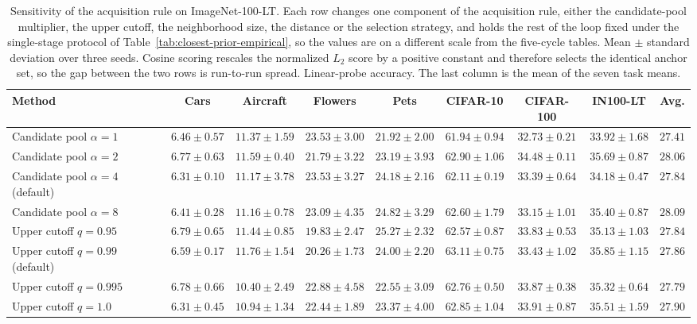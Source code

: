\begin{table}[t]
\centering
\small
\setlength{\tabcolsep}{4pt}
\caption{Sensitivity of the acquisition rule on ImageNet-100-LT. Each row changes one component of the acquisition rule, either the candidate-pool multiplier, the upper cutoff, the neighborhood size, the distance or the selection strategy, and holds the rest of the loop fixed under the single-stage protocol of Table~\ref{tab:closest-prior-empirical}, so the values are on a different scale from the five-cycle tables. Mean $\pm$ standard deviation over three seeds. Cosine scoring rescales the normalized $L_2$ score by a positive constant and therefore selects the identical anchor set, so the gap between the two rows is run-to-run spread. Linear-probe accuracy. The last column is the mean of the seven task means.}
\label{tab:selector-robustness-full-linear}
\begin{adjustbox}{max width=\textwidth}
\begin{tabular}{lcccccccc}
\toprule
Method & Cars & Aircraft & Flowers & Pets & CIFAR-10 & CIFAR-100 & IN100-LT & Avg. \\
\midrule
Candidate pool $\alpha=1$ & $6.46\pm0.57$ & $11.37\pm1.59$ & $23.53\pm3.00$ & $21.92\pm2.00$ & $61.94\pm0.94$ & $32.73\pm0.21$ & $33.92\pm1.68$ & $27.41$ \\
Candidate pool $\alpha=2$ & $6.77\pm0.63$ & $11.59\pm0.40$ & $21.79\pm3.22$ & $23.19\pm3.93$ & $62.90\pm1.06$ & $34.48\pm0.11$ & $35.69\pm0.87$ & $28.06$ \\
Candidate pool $\alpha=4$ (default) & $6.31\pm0.10$ & $11.17\pm3.78$ & $23.53\pm3.27$ & $24.18\pm2.16$ & $62.11\pm0.19$ & $33.39\pm0.64$ & $34.18\pm0.47$ & $27.84$ \\
Candidate pool $\alpha=8$ & $6.41\pm0.28$ & $11.16\pm0.78$ & $23.09\pm4.35$ & $24.82\pm3.29$ & $62.60\pm1.79$ & $33.15\pm1.01$ & $35.40\pm0.87$ & $28.09$ \\
Upper cutoff $q=0.95$ & $6.79\pm0.65$ & $11.44\pm0.85$ & $19.83\pm2.47$ & $25.27\pm2.32$ & $62.57\pm0.87$ & $33.83\pm0.53$ & $35.13\pm1.03$ & $27.84$ \\
Upper cutoff $q=0.99$ (default) & $6.59\pm0.17$ & $11.76\pm1.54$ & $20.26\pm1.73$ & $24.00\pm2.20$ & $63.11\pm0.75$ & $33.43\pm1.02$ & $35.85\pm1.15$ & $27.86$ \\
Upper cutoff $q=0.995$ & $6.78\pm0.66$ & $10.40\pm2.49$ & $22.88\pm4.58$ & $22.55\pm3.09$ & $62.76\pm0.50$ & $33.87\pm0.38$ & $35.32\pm0.64$ & $27.79$ \\
Upper cutoff $q=1.0$ & $6.31\pm0.45$ & $10.94\pm1.34$ & $22.44\pm1.89$ & $23.37\pm4.00$ & $62.85\pm1.04$ & $33.91\pm0.87$ & $35.51\pm1.59$ & $27.90$ \\

\end{tabular}
\end{adjustbox}
\end{table}

